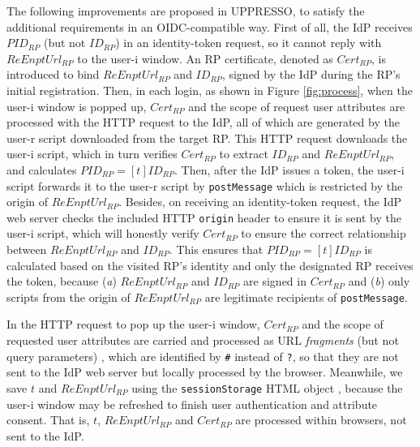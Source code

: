 The following improvements are proposed  in UPPRESSO,
    to satisfy the additional requirements in an OIDC-compatible way.
First of all, the IdP receives $PID_{RP}$ (but not $ID_{RP}$) in an identity-token request,
    so it cannot reply with $ReEnptUrl_{RP}$ to the user-i window.
An RP certificate, denoted as $Cert_{RP}$, is introduced to bind $ReEnptUrl_{RP}$ and $ID_{RP}$, signed by the IdP during the RP's initial registration.
%
%
%
Then, in each login, 
as shown in Figure \ref{fig:process},
when the user-i window is popped up,
    $Cert_{RP}$ and the scope of request user attributes are processed with the HTTP request to the IdP,
    all of which are generated by the user-r script downloaded from the target RP.
This HTTP request downloads the user-i script,
    which in turn verifies $Cert_{RP}$ to extract $ID_{RP}$ and $ReEnptUrl_{RP}$, and calculates $PID_{RP} = [t]ID_{RP}$. %
Then, after the IdP issues a token,
    the user-i script forwards it to the user-r script by \verb+postMessage+
    which is restricted by the origin of $ReEnptUrl_{RP}$.
Besides, on receiving an identity-token request, the IdP web server checks the included HTTP \texttt{origin} header to ensure it is sent by the user-i script,
which will honestly verify $Cert_{RP}$ to ensure the correct relationship between $ReEnptUrl_{RP}$ and $ID_{RP}$.
This ensures that $PID_{RP} = [t]{ID_{RP}}$ is calculated based on the visited RP's identity
    and only the designated RP receives the token,
    because (\emph{a}) $ReEnptUrl_{RP}$ and $ID_{RP}$ are signed in $Cert_{RP}$
        and (\emph{b}) only scripts from the origin of $ReEnptUrl_{RP}$ are legitimate recipients of \verb+postMessage+.

In the HTTP request to pop up the user-i window, $Cert_{RP}$ and the scope of requested user attributes are carried and processed as URL \emph{fragments} (but not query parameters) \cite{url-fragment}, which are identified by \texttt{\#} instead of \texttt{?},
    so that they are not sent to the IdP web server but locally processed by the browser.
Meanwhile, we save $t$ and $ReEnptUrl_{RP}$ using the \verb+sessionStorage+ HTML object \cite{htmlStorageHtml},
    because the user-i window may be refreshed to finish user authentication and attribute consent.
That is, $t$, $ReEnptUrl_{RP}$ and $Cert_{RP}$ are processed within browsers,
    not sent to the IdP.

